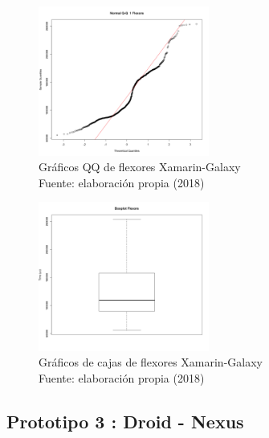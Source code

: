 \begin{figure}[H]
  \begin{center} 
   	\includegraphics[width=0.5\textwidth]{evaluation/graphics/Xamarin/Galaxy/NormalQQFlexorsXamarinGalaxy.png} 
    \caption[Gráfico QQ de flexores Xamarin-Galaxy]{Gráficos QQ de flexores Xamarin-Galaxy\\Fuente: elaboración propia (2018)} 
    \label{fig:xamarin-galaxy-QQ-flexors}
  \end{center}
\end{figure}

\begin{figure}[H]
  \begin{center} 
   	\includegraphics[width=0.5\textwidth]{evaluation/graphics/Xamarin/Galaxy/BoxplotFlexorsXamarinGalaxy.png} 
    \caption[Gráficos de cajas de flexores Xamarin-Galaxy]{Gráficos de cajas de flexores Xamarin-Galaxy\\Fuente: elaboración propia (2018)} 
    \label{fig:xamarin-galaxy-boxplot-flexors}
  \end{center}
\end{figure}



\subsection{Prototipo 3 : Droid - Nexus}

